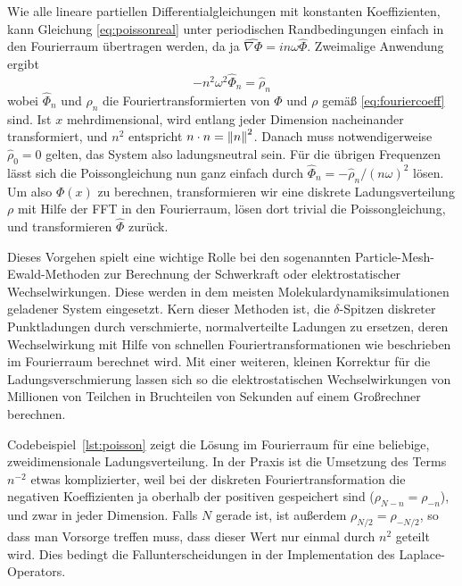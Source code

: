 Wie alle lineare partiellen Differentialgleichungen mit konstanten
Koeffizienten, kann Gleichung \eqref{eq:poissonreal} unter
periodischen Randbedingungen einfach in den Fourierraum übertragen
werden, da ja $\widehat{\nabla \Phi} = i n \omega \hat \Phi$. Zweimalige
Anwendung ergibt
\begin{equation}
  \label{eq:poissonft}
  -n^2\omega^2\hat\Phi_n  = \hat\rho_n
\end{equation}
wobei $\hat\Phi_n$ und $\hat\rho_n$ die Fouriertransformierten von
$\Phi$ und $\rho$ gemäß \eqref{eq:fouriercoeff} sind. Ist $x$
mehrdimensional, wird entlang jeder Dimension nacheinander
transformiert, und $n^2$ entspricht $n\cdot n = \left\lVert{n}\right\rVert^2$. Danach muss
notwendigerweise $\hat\rho_0 = 0$ gelten, das System also
ladungsneutral sein. Für die übrigen Frequenzen lässt sich die
Poissongleichung nun ganz einfach durch $\hat\Phi_n =
-\hat\rho_n/(n\omega)^2$ lösen. Um also $\Phi(x)$ zu berechnen,
transformieren wir eine diskrete Ladungsverteilung $\rho$ mit Hilfe
der FFT in den Fourierraum, lösen dort trivial die Poissongleichung,
und transformieren $\hat\Phi$ zurück.

%

Dieses Vorgehen spielt eine wichtige Rolle bei den sogenannten
Particle-Mesh-Ewald-Methoden zur Berechnung der Schwerkraft oder
elektrostatischer Wechselwirkungen. Diese werden in dem meisten
Molekulardynamiksimulationen geladener System eingesetzt. Kern dieser
Methoden ist, die $\delta$-Spitzen diskreter Punktladungen durch
verschmierte, normalverteilte Ladungen zu ersetzen, deren
Wechselwirkung mit Hilfe von schnellen Fouriertransformationen wie
beschrieben im Fourierraum berechnet wird. Mit einer weiteren, kleinen
Korrektur für die Ladungsverschmierung lassen sich so die
elektrostatischen Wechselwirkungen von Millionen von Teilchen in
Bruchteilen von Sekunden auf einem Großrechner berechnen.

Codebeispiel~\ref{lst:poisson} zeigt die Lösung im Fourierraum für
eine beliebige, zweidimensionale Ladungsverteilung. In der Praxis ist
die Umsetzung des Terms $n^{-2}$ etwas komplizierter, weil bei der
diskreten Fouriertransformation die negativen Koeffizienten ja
oberhalb der positiven gespeichert sind ($\rho_{N-n}=\rho_{-n}$), und
zwar in jeder Dimension. Falls $N$ gerade ist, ist außerdem
$\rho_{N/2} = \rho_{-N/2}$, so dass man Vorsorge treffen muss, dass
dieser Wert nur einmal durch $n^2$ geteilt wird. Dies bedingt die
Fallunterscheidungen in der Implementation des Laplace-Operators.

